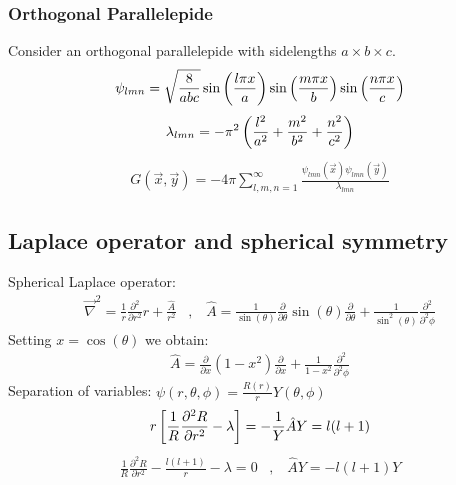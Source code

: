 \subsubsection{Orthogonal Parallelepide}
Consider an orthogonal parallelepide with sidelengths $a \times b \times c$.
\begin{align*}
    \psi_{lmn} = \sqrt{\frac{8}{abc}} \sin \left( \frac{l \pi x}{a} \right)
        \sin \left( \frac{m \pi x}{b} \right) \sin \left( \frac{n \pi x}{c} \right)
\end{align*}
\begin{align*}
    \lambda_{lmn} = - \pi^2 \left( \frac{l^2}{a^2} + \frac{m^2}{b^2} + \frac{n^2}{c^2} \right)
\end{align*}
\begin{align*}
    G (\vec{x},\vec{y}) = - 4 \pi \sum_{l,m,n=1}^\infty \frac{\psi_{lmn}(\vec{x}) \psi_{lmn}(\vec{y})}{\lambda_{lmn}}
\end{align*}

\subsection{Laplace operator and spherical symmetry}

Spherical Laplace operator:
\begin{align*}
    \vec{\nabla}^2 = \frac{1}{r} \frac{\partial^2}{\partial r^2} r + \frac{\hat{A}}{r^2}
    \hspace{10pt} , \hspace{10pt}
    \hat{A} = \frac{1}{\sin(\theta)} \frac{\partial}{\partial \theta} \sin(\theta) \frac{\partial}{\partial \theta} + \frac{1}{\sin^2 (\theta)} \frac{\partial^2}{\partial^2 \phi}
\end{align*}
Setting $x = \cos(\theta)$ we obtain:
\begin{align*}
    \hat{A} = \frac{\partial}{\partial x} (1-x^2) \frac{\partial}{\partial x} + \frac{1}{1-x^2} \frac{\partial^2}{\partial^2 \phi}
\end{align*}
Separation of variables: $\psi(r,\theta,\phi) = \frac{R(r)}{r} Y(\theta,\phi)$
\begin{align*}
    r \left[ \frac{1}{R} \frac{\partial^2 R}{\partial r^2} - \lambda \right] = - \frac{1}{Y} \hat{A} Y
    = l(l+1)
\end{align*}
\begin{align*}
    \frac{1}{R} \frac{\partial^2 R}{\partial r^2} - \frac{l(l+1)}{r} - \lambda = 0
    \hspace{10pt} , \hspace{10pt}
    \hat{A} Y = - l(l+1) Y
\end{align*}

